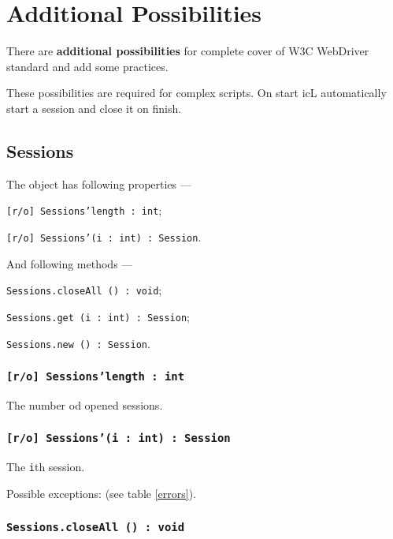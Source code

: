 

\section{Additional Possibilities}

There are {\bf additional possibilities} for complete cover of W3C WebDriver standard and add some practices.

These possibilities are required for complex scripts. On start icL automatically start a session and close it on finish.

\subsection{Sessions}

The object \sessions{} has following properties —
\begin{icItems}
	\item \texttt{[r/o] Sessions'length : int};
	\item \texttt{[r/o] Sessions'(i : int) : Session}.
\end{icItems}

And following methods —
\begin{icItems}
	\item \texttt{Sessions.closeAll () : void};
	\item \texttt{Sessions.get (i : int) : Session};
	\item \texttt{Sessions.new () : Session}.
\end{icItems}

\subsubsection{\texttt{[r/o] Sessions'length : int}}

The number od opened sessions.

\subsubsection{\texttt{[r/o] Sessions'(i : int) : Session}}

The \texttt{i}th session.

Possible exceptions:  (see table \ref{errors}).

\subsubsection{\texttt{Sessions.closeAll () : void}}

